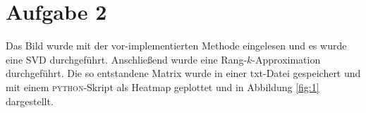 \section*{Aufgabe 2}
Das Bild wurde mit der vor-implementierten Methode eingelesen und es wurde
eine SVD durchgeführt. Anschließend wurde eine Rang-$k$-Approximation durchgeführt.
Die so entstandene Matrix wurde in einer txt-Datei gespeichert und mit einem
\textsc{python}-Skript als Heatmap geplottet und in Abbildung \ref{fig:1}
dargestellt.
